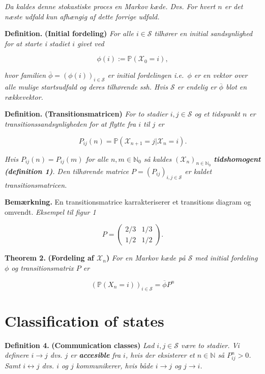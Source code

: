 \documentclass[a4paper,10pt,openany]{book}
\begin{document}
\emph{Da kaldes denne stokastiske proces en Markov kæde. Dvs. For hvert \(n\) er det næste udfald kun afhængig af dette forrige udfald.}

\textbf{Definition.} \textbf{(Initial fordeling)} \emph{For alle \(i\in\mathcal{S}\) tilhører en initial sandsynlighed for at starte i stadiet \(i\) givet ved}

\[
\phi(i):=\mathbb{P}(\mathcal{X}_0=i),
\]

\emph{hvor familien \(\overline{\phi}=(\phi(i))_{i\in\mathcal{S}}\) er initial fordelingen i.e.~\(\phi\) er en vektor over alle mulige startsudfald og deres tilhørende ssh. Hvis \(\mathcal{S}\) er endelig er \(\overline{\phi}\) blot en rækkevektor.}

\textbf{Definition.} \textbf{(Transitionsmatricen)} \emph{For to stadier \(i,j\in\mathcal{S}\) og et tidspunkt \(n\) er transitionssandsynligheden for at flytte fra \(i\) til \(j\) er}

\[
P_{ij}(n)=\mathbb{P}(\mathcal{X}_{n+1}=j \vert \mathcal{X}_n=i).
\]

\emph{Hvis \(P_{ij}(n)=P_{ij}(m)\) for alle \(n,m\in\mathbb{N}_0\) så kaldes \((\mathcal{X}_n)_{n\in\mathbb{N}_0}\) \textbf{tidshomogent (definition 1)}. Den tilhørende matrice \(P=(P_{ij})_{i,j\in\mathcal{S}}\) er kaldet transitionsmatricen.}

\textbf{Bemærkning.} En transitionsmatrice karrakteriserer et transitions diagram og omvendt. \textit{Eksempel til figur 1}

\[
P=\begin{pmatrix}
2/3 & 1/3\\
1/2 & 1/2
\end{pmatrix}.
\]

\textbf{Theorem 2.} \textbf{(Fordeling af \(\mathcal{X}_n\))} \emph{For en Markov kæde på \(\mathcal{S}\) med initial fordeling \(\phi\) og transitionsmatrix \(P\) er}

\[
(\mathbb{P}(X_n=i))_{i\in\mathcal{S}}=\overline{\phi} P^n
\]

\hypertarget{classification-of-states}{%
\section{Classification of states}\label{classification-of-states}}

\textbf{Definition 4.} \textbf{(Communication classes)} \emph{Lad \(i,j\in\mathcal{S}\) være to stadier. Vi definere \(i\longrightarrow j\) dvs. \(j\) er \textbf{accesible} fra \(i\), hvis der eksisterer et \(n\in\mathbb{N}\) så \(P_{ij}^n>0\). Samt \(i\longleftrightarrow j\) dvs. \(i\) og \(j\) kommunikerer, hvis både \(i\longrightarrow j\) og \(j\longrightarrow i\).}
\end{document}
